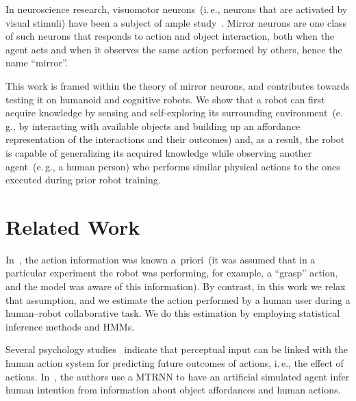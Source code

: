 \documentclass[a4paper]{article}
\newcommand{\eg}{e.\,g.}
\newcommand{\ie}{i.\,e.}
\newcommand{\hr}{human--robot}
\begin{document}
In neuroscience research, visuomotor neurons~(\ie, neurons that are activated by visual stimuli) have been a subject of ample study~\cite{rizzolatti:2001:nrn}. Mirror neurons are one class of such neurons that responds to action and object interaction, both when the agent acts and when it observes the same action performed by others, hence the name ``mirror''.

This work is framed within the theory of mirror neurons, and contributes towards testing it on humanoid and cognitive robots. We show that a robot can first acquire knowledge by sensing and self-exploring its surrounding environment~(\eg, by interacting with available objects and building up an affordance representation of the interactions and their outcomes) and, as a result, the robot is capable of generalizing its acquired knowledge while observing another agent~(\eg, a human person) who performs similar physical actions to the ones executed during prior robot training.

\section{Related Work}

In~\cite{salvi:2012:smcb}, the action information was known a~priori~(it was assumed that in a particular experiment the robot was performing, for example, a ``grasp'' action, and the model was aware of this information). By contrast, in this work we relax that assumption, and we estimate the action performed by a human user during a \hr{} collaborative task. We do this estimation by employing statistical inference methods and \acp{HMM}.

Several psychology studies~\cite{aglioti:2008:basketball,knoblich:2001:psychsci} indicate that perceptual input can be linked with the human action system for predicting future outcomes of actions, \ie, the effect of actions. In~\cite{kim:2017:nn}, the authors use a \ac{MTRNN} to have an artificial simulated agent infer human intention from information about object affordances and human actions.
\end{document}
